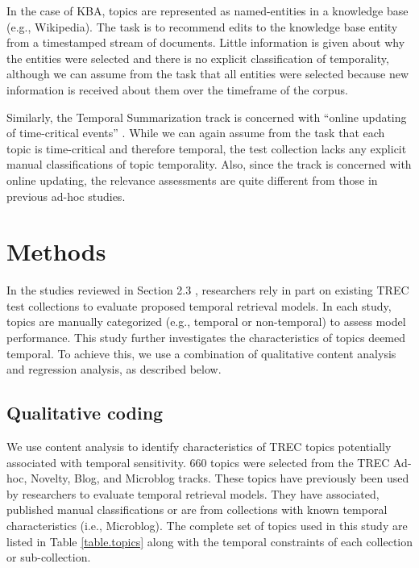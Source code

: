 \documentclass{sig-alternate}
\begin{document}
In the case of KBA, topics are represented as named-entities in a knowledge base (e.g., Wikipedia). The task is to recommend edits to the knowledge base entity from a timestamped stream of documents.  Little information is given about why the entities were selected and there is no explicit classification of temporality, although we can assume from the task that all entities were selected because new information is received about them over the timeframe of the corpus.

Similarly, the Temporal Summarization track is concerned with ``online updating of time-critical events'' \cite{Guo2013}. While we can again assume from the task that each topic is time-critical and therefore temporal, the test collection lacks any explicit manual classifications of topic temporality.  Also, since the track is concerned with online updating, the relevance assessments are quite different from those in previous ad-hoc studies.



\section{Methods}

In the studies reviewed in Section 2.3 , researchers rely in part on existing TREC test collections to evaluate proposed temporal retrieval models. In each study, topics are manually categorized (e.g.,  temporal or non-temporal) to assess model performance. This study further investigates the characteristics of topics deemed temporal. To achieve this, we use a combination of qualitative content analysis and regression analysis, as described below.

\subsection{Qualitative coding}
We use content analysis \cite{Krippendorff1980} to identify characteristics of TREC topics potentially associated with temporal sensitivity. 660 topics were selected from the TREC Ad-hoc, Novelty, Blog, and Microblog tracks. These topics have previously been used by researchers to evaluate temporal retrieval models. They have associated, published manual classifications or are from collections with known temporal characteristics (i.e., Microblog). The complete set of topics used in this study are listed in Table \ref{table.topics} along with the temporal constraints of each collection or sub-collection.
\end{document}
